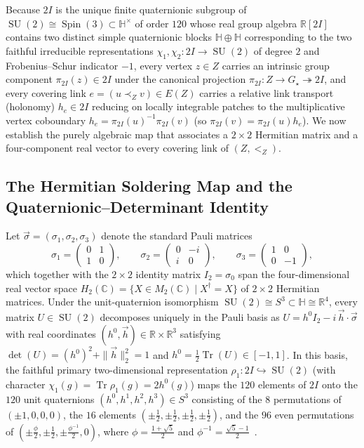 \documentclass[11pt,a4paper]{article}
\theoremstyle{definition}
\theoremstyle{remark}
\newcommand{\R}{\mathbb{R}}
\newcommand{\C}{\mathbb{C}}
\newcommand{\quat}{\mathbb{H}}
\newcommand{\Tr}{\operatorname{Tr}}
\newcommand{\SU}{\operatorname{SU}}
\newcommand{\Spin}{\operatorname{Spin}}
\newcommand{\Gstar}{G_\star}
\begin{document}
Because $2I$ is the unique finite quaternionic subgroup of $\SU(2) \cong \Spin(3) \subset \quat^\times$ of order $120$ whose real group algebra $\R[2I]$ contains two distinct simple quaternionic blocks $\quat \oplus \quat$ corresponding to the two faithful irreducible representations $\chi_1, \chi_2 : 2I \to \SU(2)$ of degree $2$ and Frobenius--Schur indicator $-1$, every vertex $z \in Z$ carries an intrinsic group component $\pi_{2I}(z) \in 2I$ under the canonical projection $\pi_{2I} : Z \to \Gstar \twoheadrightarrow 2I$, and every covering link $e = (u \prec_Z v) \in E(Z)$ carries a relative link transport (holonomy) $h_e \in 2I$ reducing on locally integrable patches to the multiplicative vertex coboundary $h_e = \pi_{2I}(u)^{-1}\pi_{2I}(v)$ (so $\pi_{2I}(v) = \pi_{2I}(u)h_e$). We now establish the purely algebraic map that associates a $2 \times 2$ Hermitian matrix and a four-component real vector to every covering link of $(Z, <_Z)$.

\subsection{The Hermitian Soldering Map and the Quaternionic--Determinant Identity}

Let $\vec{\sigma} = (\sigma_1, \sigma_2, \sigma_3)$ denote the standard Pauli matrices
\begin{equation}
\sigma_1 = \begin{pmatrix} 0 & 1 \\ 1 & 0 \end{pmatrix}, \qquad
\sigma_2 = \begin{pmatrix} 0 & -i \\ i & 0 \end{pmatrix}, \qquad
\sigma_3 = \begin{pmatrix} 1 & 0 \\ 0 & -1 \end{pmatrix},
\end{equation}
which together with the $2 \times 2$ identity matrix $I_2 = \sigma_0$ span the four-dimensional real vector space $H_2(\C) = \{X \in M_2(\C) \mid X^\dagger = X\}$ of $2 \times 2$ Hermitian matrices. Under the unit-quaternion isomorphism $\SU(2) \cong S^3 \subset \quat \cong \R^4$, every matrix $U \in \SU(2)$ decomposes uniquely in the Pauli basis as $U = h^0 I_2 - i\,\vec{h}\cdot\vec{\sigma}$ with real coordinates $(h^0, \vec{h}) \in \R \times \R^3$ satisfying $\det(U) = (h^0)^2 + \|\vec{h}\|_2^2 = 1$ and $h^0 = \frac{1}{2}\Tr(U) \in [-1, 1]$. In this basis, the faithful primary two-dimensional representation $\rho_1 : 2I \hookrightarrow \SU(2)$ (with character $\chi_1(g) = \Tr\rho_1(g) = 2h^0(g)$) maps the $120$ elements of $2I$ onto the $120$ unit quaternions $(h^0, h^1, h^2, h^3) \in S^3$ consisting of the $8$ permutations of $(\pm 1, 0, 0, 0)$, the $16$ elements $(\pm\frac{1}{2}, \pm\frac{1}{2}, \pm\frac{1}{2}, \pm\frac{1}{2})$, and the $96$ even permutations of $(\pm\frac{\phi}{2}, \pm\frac{1}{2}, \pm\frac{\phi^{-1}}{2}, 0)$, where $\phi = \frac{1+\sqrt{5}}{2}$ and $\phi^{-1} = \frac{\sqrt{5}-1}{2}$~\cite{Coxeter1974}.
\end{document}
